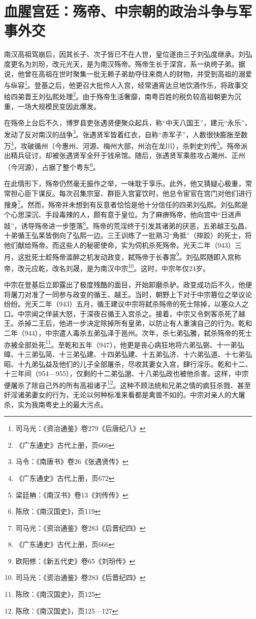 \section{血腥宫廷：殇帝、中宗朝的政治斗争与军事外交}

南汉高祖驾崩后，因其长子、次子皆已不在人世，皇位遂由三子刘弘度继承。刘弘度更名为刘玢，改元光天，是为南汉殇帝。殇帝生长于深宫，系一纨绔子弟。据说，他曾在高祖在世时聚集一批无赖子弟劫夺往来商人的财物，并受到高祖的溺爱与纵容\footnote{司马光：《资治通鉴》卷279《后唐纪八》}。登基之后，他更召大批伶人入宫，经常通宵达旦地饮酒作乐，将政事交给四弟晋王刘弘熙处理\footnote{《广东通史》古代上册，页666}。由于殇帝生活奢靡，南粤百姓的税负较高祖朝更为沉重，一场大规模民变因此爆发。

在殇帝上台后不久，博罗县吏张遇贤便聚众起兵，称“中天八国王”，建元“永乐”，发动了反对南汉的战争\footnote{马令：《南唐书》卷26《张遇贤传》}。张遇贤军皆着红衣，自称“赤军子”，人数很快膨胀至数万\footnote{《广东通史》古代上册，页672}，攻破循州（今惠州、河源、梅州大部，州治在龙川），杀刺史刘传\footnote{梁廷柟：《南汉书》卷13《刘传传》}。殇帝派出精兵征讨，却被张遇贤军全歼于钱帛馆。随后，张遇贤军乘胜攻占潮州、正州（今河源），占据了整个粤东\footnote{陈欣：《南汉国史》，页119}。

在此情形下，殇帝仍然毫无振作之举，一味耽于享乐。此外，他又猜疑心极重，常常担心臣下谋反。每次召集宗室、群臣入宫宴饮时，他总令宦官在宫门对他们进行搜身\footnote{司马光：《资治通鉴》卷283《后晋纪四》}。然而，殇帝并未想到有反意者恰恰是他十分信任的四弟刘弘熙。刘弘熙是个心思深沉、手段毒辣的人，颇有意于皇位。为了麻痹殇帝，他向宫中“日进声妓”，诱导殇帝进一步堕落\footnote{《广东通史》古代上册，页666}。殇帝的荒淫终于引发其诸弟的厌恶，五弟越王弘昌、十弟循王弘杲皆倒向了弘熙一边。三王训练了一批熟习“角抵”（摔跤）的死士，将他们献给殇帝。而这些人的秘密使命，实为伺机杀死殇帝。光天二年（943）三月，这批死士趁殇帝滥醉之机发动政变，弑殇帝于长春宫\footnote{欧阳修：《新五代史》卷65《刘玢传》}。刘弘熙随即入宫称帝，改元应乾，改名刘晟，是为南汉中宗\footnote{司马光：《资治通鉴》卷283《后晋纪四》}。这时，中宗年仅24岁。

中宗在登基后立即露出了极度残酷的面目，开始卸磨杀驴。政变成功后不久，他便将屠刀对准了一同参与政变的循王、越王。当时，朝野上下对于中宗篡位之举议论纷纷。光天二年（943）五月，循王建议中宗将弑杀殇帝的死士除掉，以塞众人之口。中宗闻之佯装大怒，于深夜召循王入宫杀之。接着，中宗又令刺客杀死了越王。杀掉二王后，他进一步决定除掉所有皇弟，以防止有人重演自己的行为。乾和二年（944），中宗遣人毒杀五弟弘泽于邕州。次年，杀七弟弘雅，弑杀殇帝的死士亦被全部处死\footnote{陈欣：《南汉国史》，页125}。至乾和五年（947），他更是丧心病狂地将六弟弘弼、十一弟弘暐、十三弟弘简、十三弟弘建、十四弟弘建、十五弟弘济、十六弟弘道、十七弟弘昭、十九弟弘益及他们的儿子全部屠杀，尽收其妻女入宫，肆行淫乐。乾和十二、十三年间（954—955），仅剩的十二弟弘邈、十八弟弘政也被他杀害。这样，中宗便屠杀了除自己外的所有高祖诸子\footnote{陈欣：《南汉国史》，页125—127}。这种不顾法统和兄弟之情的疯狂杀戮、甚至奸淫诸弟妻女的行为，无论以何种标准来看都是禽兽不如的。中宗对亲人的大屠杀，实为我南粤史上的最大污点。

